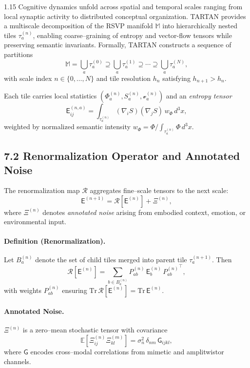 \documentclass[12pt,a4paper]{article}
\begin{document}
\begin{spacing}{1.15}
Cognitive dynamics unfold across spatial and temporal scales ranging from local synaptic activity to distributed conceptual organization.  
TARTAN provides a multiscale decomposition of the RSVP manifold $\mathbb{M}$ into hierarchically nested tiles $\tau_a^{(n)}$, enabling coarse–graining of entropy and vector-flow tensors while preserving semantic invariants.  
Formally, TARTAN constructs a sequence of partitions
\[
\mathbb{M}=\bigcup_a\tau_a^{(0)}\supseteq
\bigcup_a\tau_a^{(1)}\supseteq\cdots\supseteq
\bigcup_a\tau_a^{(N)},
\]
with scale index $n\in\{0,\dots,N\}$ and tile resolution $h_n$ satisfying $h_{n+1}>\!h_n$.  

Each tile carries local statistics $(\Phi_a^{(n)},S_a^{(n)},\boldsymbol{\mathcal v}_a^{(n)})$ and an \emph{entropy tensor}
\begin{equation}
\mathsf{E}_{ij}^{(n,a)}
 = \int_{\tau_a^{(n)}}
   (\nabla_i S)(\nabla_j S)\,w_\Phi\,d^3x,
\label{eq:Eij}
\end{equation}
weighted by normalized semantic intensity $w_\Phi=\Phi/\!\int_{\tau_a^{(n)}}\Phi\,d^3x$.

\subsection{7.2 Renormalization Operator and Annotated Noise}

The renormalization map $\mathcal{R}$ aggregates fine–scale tensors to the next scale:
\begin{equation}
\mathsf{E}^{(n+1)} =
 \mathcal{R}[\mathsf{E}^{(n)}] + \Xi^{(n)},
\label{eq:renorm}
\end{equation}
where $\Xi^{(n)}$ denotes \emph{annotated noise} arising from embodied context, emotion, or environmental input.

\paragraph{Definition (Renormalization).}
Let $B_a^{(n)}$ denote the set of child tiles merged into parent tile $\tau_a^{(n+1)}$.  
Then
\[
\mathcal{R}[\mathsf{E}^{(n)}]
 = \sum_{b\in B_a^{(n)}}
   P_{ab}^{(n)}\,\mathsf{E}_b^{(n)}\,{P_{ab}^{(n)}}^\top,
\]
with weights $P_{ab}^{(n)}$ ensuring $\mathrm{Tr}\,\mathcal{R}[\mathsf{E}^{(n)}]=\mathrm{Tr}\,\mathsf{E}^{(n)}$.

\paragraph{Annotated Noise.}
$\Xi^{(n)}$ is a zero–mean stochastic tensor with covariance
\[
\mathbb{E}[\Xi^{(n)}_{ij}\Xi^{(m)}_{kl}]
 = \sigma_n^2\,\delta_{nm}\,\mathsf{G}_{ijkl},
\]
where $\mathsf{G}$ encodes cross–modal correlations from mimetic and amplitwistor channels.


\end{spacing}
\end{document}
